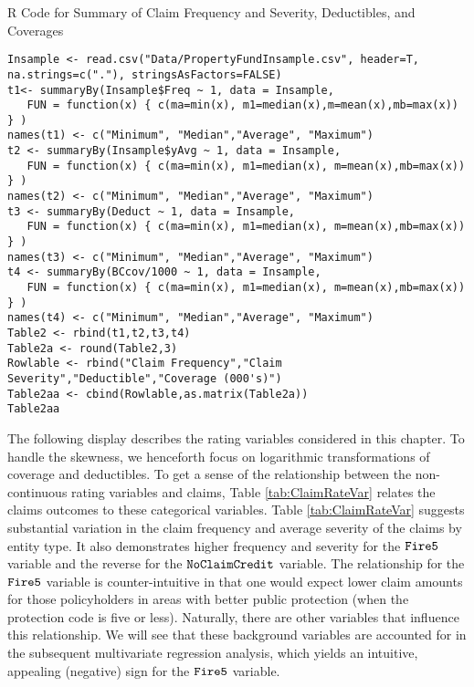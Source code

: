 \documentclass[]{book}
\theoremstyle{definition}
\theoremstyle{definition}
\theoremstyle{definition}
\theoremstyle{remark}
\begin{document}
R Code for Summary of Claim Frequency and Severity, Deductibles, and
Coverages

\hypertarget{display.DeductCov.2}{}
\begin{verbatim}
Insample <- read.csv("Data/PropertyFundInsample.csv", header=T, na.strings=c("."), stringsAsFactors=FALSE)
t1<- summaryBy(Insample$Freq ~ 1, data = Insample, 
   FUN = function(x) { c(ma=min(x), m1=median(x),m=mean(x),mb=max(x)) } )
names(t1) <- c("Minimum", "Median","Average", "Maximum")
t2 <- summaryBy(Insample$yAvg ~ 1, data = Insample, 
   FUN = function(x) { c(ma=min(x), m1=median(x), m=mean(x),mb=max(x)) } )
names(t2) <- c("Minimum", "Median","Average", "Maximum")
t3 <- summaryBy(Deduct ~ 1, data = Insample, 
   FUN = function(x) { c(ma=min(x), m1=median(x), m=mean(x),mb=max(x)) } )
names(t3) <- c("Minimum", "Median","Average", "Maximum")
t4 <- summaryBy(BCcov/1000 ~ 1, data = Insample, 
   FUN = function(x) { c(ma=min(x), m1=median(x), m=mean(x),mb=max(x)) } )
names(t4) <- c("Minimum", "Median","Average", "Maximum")
Table2 <- rbind(t1,t2,t3,t4)
Table2a <- round(Table2,3)
Rowlable <- rbind("Claim Frequency","Claim Severity","Deductible","Coverage (000's)")
Table2aa <- cbind(Rowlable,as.matrix(Table2a))
Table2aa
\end{verbatim}

The following display describes the rating variables considered in this
chapter. To handle the skewness, we henceforth focus on logarithmic
transformations of coverage and deductibles. To get a sense of the
relationship between the non-continuous rating variables and claims,
Table \ref{tab:ClaimRateVar} relates the claims outcomes to these
categorical variables. Table \ref{tab:ClaimRateVar} suggests substantial
variation in the claim frequency and average severity of the claims by
entity type. It also demonstrates higher frequency and severity for the
\({\tt Fire5}\) variable and the reverse for the \({\tt NoClaimCredit}\)
variable. The relationship for the \({\tt Fire5}\) variable is
counter-intuitive in that one would expect lower claim amounts for those
policyholders in areas with better public protection (when the
protection code is five or less). Naturally, there are other variables
that influence this relationship. We will see that these background
variables are accounted for in the subsequent multivariate regression
analysis, which yields an intuitive, appealing (negative) sign for the
\({\tt Fire5}\) variable.
\end{document}

